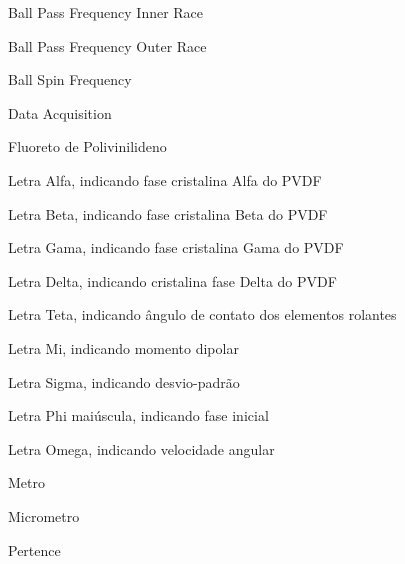 \documentclass[
	12pt,				
	oneside,			
	a4paper,			
	english,			
	brazil,			
	]{abntex2ppgsi}
\begin{document}
\listoffigures*
\cleardoublepage
\listoftables*
\cleardoublepage




%
%
\begin{siglas}
  \item[BPFI] Ball Pass Frequency Inner Race
  \item[BPFO] Ball Pass Frequency Outer Race
  \item[BSF] Ball Spin Frequency 
  \item[DAQ] Data Acquisition
  \item[PVDF] Fluoreto de Polivinilideno
\end{siglas}


\begin{simbolos}
  \item[$ \alpha $] Letra Alfa, indicando fase cristalina Alfa do PVDF
  \item[$ \beta $] Letra Beta, indicando fase cristalina Beta do PVDF
  \item[$ \gamma $] Letra Gama, indicando fase cristalina Gama do PVDF
  \item[$ \delta $] Letra Delta, indicando cristalina fase Delta do PVDF
  \item[$ \theta $] Letra Teta, indicando ângulo de contato dos elementos rolantes
  \item[$ \mu $] Letra Mi, indicando momento dipolar 
  \item[$ \sigma $] Letra Sigma, indicando desvio-padrão
  \item[$ \upphi $] Letra Phi maiúscula, indicando fase inicial
  \item[$ \omega $] Letra Omega, indicando velocidade angular 
  \item[\SI{}{\metre}] Metro  
  \item[\SI{}{\micro\metre}] Micrometro
  \item[$ \in $] Pertence
\end{simbolos}
\end{document}
